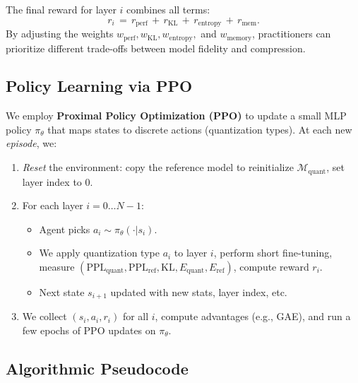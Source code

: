 \documentclass{article}
\begin{document}
    The final reward for layer \(i\) combines all terms:
    \begin{equation}
    	\label{eq:reward_final}
    	r_i 
    	\,=\,
    	r_{\mathrm{perf}} 
    	\,+\, 
    	r_{\mathrm{KL}} 
    	\,+\, 
    	r_{\mathrm{entropy}} 
    	\,+\, 
    	r_{\mathrm{mem}}.
    \end{equation}
    By adjusting the weights \(w_{\mathrm{perf}}, w_{\mathrm{KL}}, w_{\mathrm{entropy}},\) and \(w_{\mathrm{memory}}\), practitioners can prioritize different trade-offs between model fidelity and compression.
    		
	\subsection{Policy Learning via PPO}
	We employ \textbf{Proximal Policy Optimization (PPO)} \cite{ppo2017} to update a small MLP policy $\pi_\theta$ that maps states to discrete actions (quantization types). At each new \emph{episode}, we:
	\begin{enumerate}
		\item \emph{Reset} the environment: copy the reference model to reinitialize $\mathcal{M}_\text{quant}$, set layer index to 0.
		\item For each layer $i=0 \dots N-1$:
		\begin{itemize}
			\item Agent picks $a_i \sim \pi_\theta(\cdot|s_i)$.
			\item We apply quantization type $a_i$ to layer $i$, perform short fine-tuning, measure $(\mathrm{PPL}_\text{quant}, \mathrm{PPL}_\text{ref}, \mathrm{KL}, E_\text{quant}, E_\text{ref})$, compute reward $r_i$.
			\item Next state $s_{i+1}$ updated with new stats, layer index, etc.
		\end{itemize}
		\item We collect $(s_i,a_i,r_i)$ for all $i$, compute advantages (e.g., GAE), and run a few epochs of PPO updates on $\pi_\theta$.
	\end{enumerate}
	
	\vspace{-0.75em}
	\subsection{Algorithmic Pseudocode}
	\label{subsec:pseudocode}
	\vspace{-0.25em}
	
\end{document}
